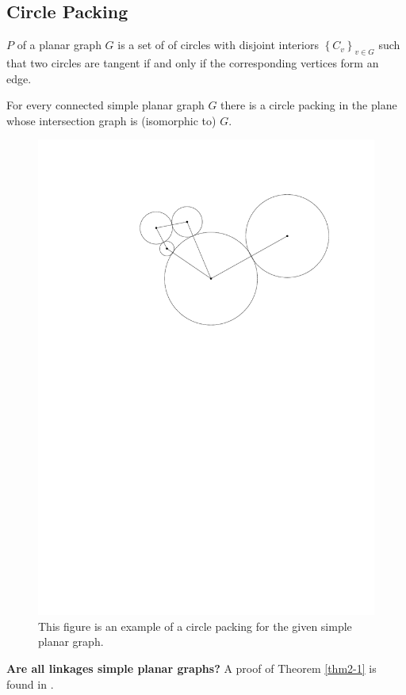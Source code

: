 

\subsection{Circle Packing}
\begin{definition}\label{def:circlePacking}
$P$ of a planar graph $G$ is a set of of circles with disjoint
interiors $\left\lbrace C_v \right\rbrace_{v \in G} $ such that two
circles are tangent if and only if the corresponding vertices form an edge.
\cite{arXiv13113363v1}
\end{definition} 


\begin{thm}\label{thm2-1}
For every connected simple planar graph $G$ there is a circle packing in the
plane whose intersection graph is (isomorphic to) $G$.
\end{thm}
\begin{figure}[h]
\begin{center}
\includegraphics[scale=.5]{graphics/circlePackingTheoremExample.pdf}
\end{center} 
\caption{This figure is an example of a circle packing for the given simple planar graph.}
\end{figure} 
\textbf{Are all linkages simple planar graphs?}  A proof of Theorem \ref{thm2-1} is found in \cite{stephenson2005introduction}.
